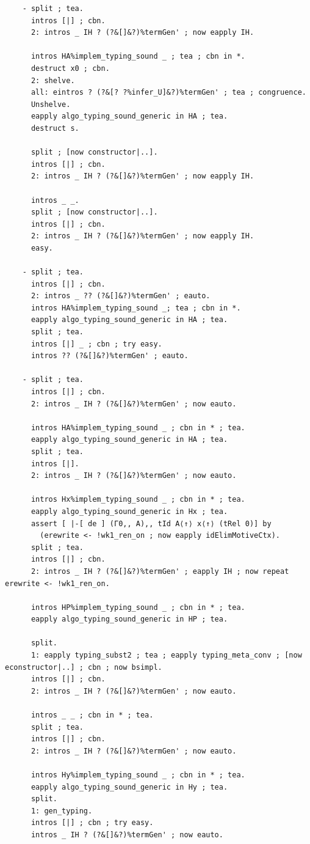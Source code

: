 \documentclass[10pt,a4paper]{amsart}
\begin{document}
\begin{lstlisting}
    - split ; tea.
      intros [|] ; cbn.
      2: intros _ IH ? (?&[]&?)%termGen' ; now eapply IH.
      
      intros HA%implem_typing_sound _ ; tea ; cbn in *.
      destruct x0 ; cbn.
      2: shelve.
      all: eintros ? (?&[? ?%infer_U]&?)%termGen' ; tea ; congruence.
      Unshelve.
      eapply algo_typing_sound_generic in HA ; tea.
      destruct s.

      split ; [now constructor|..].
      intros [|] ; cbn.
      2: intros _ IH ? (?&[]&?)%termGen' ; now eapply IH.

      intros _ _.
      split ; [now constructor|..].
      intros [|] ; cbn.
      2: intros _ IH ? (?&[]&?)%termGen' ; now eapply IH.
      easy.

    - split ; tea.
      intros [|] ; cbn.
      2: intros _ ?? (?&[]&?)%termGen' ; eauto.
      intros HA%implem_typing_sound _; tea ; cbn in *.
      eapply algo_typing_sound_generic in HA ; tea.
      split ; tea.
      intros [|] _ ; cbn ; try easy.
      intros ?? (?&[]&?)%termGen' ; eauto.

    - split ; tea.
      intros [|] ; cbn.
      2: intros _ IH ? (?&[]&?)%termGen' ; now eauto.

      intros HA%implem_typing_sound _ ; cbn in * ; tea.
      eapply algo_typing_sound_generic in HA ; tea.
      split ; tea.
      intros [|].
      2: intros _ IH ? (?&[]&?)%termGen' ; now eauto.

      intros Hx%implem_typing_sound _ ; cbn in * ; tea.
      eapply algo_typing_sound_generic in Hx ; tea.
      assert [ |-[ de ] (Γ0,, A),, tId A⟨↑⟩ x⟨↑⟩ (tRel 0)] by
        (erewrite <- !wk1_ren_on ; now eapply idElimMotiveCtx).
      split ; tea.
      intros [|] ; cbn.
      2: intros _ IH ? (?&[]&?)%termGen' ; eapply IH ; now repeat erewrite <- !wk1_ren_on.

      intros HP%implem_typing_sound _ ; cbn in * ; tea.
      eapply algo_typing_sound_generic in HP ; tea.

      split.
      1: eapply typing_subst2 ; tea ; eapply typing_meta_conv ; [now econstructor|..] ; cbn ; now bsimpl.
      intros [|] ; cbn.
      2: intros _ IH ? (?&[]&?)%termGen' ; now eauto.

      intros _ _ ; cbn in * ; tea.
      split ; tea.
      intros [|] ; cbn.
      2: intros _ IH ? (?&[]&?)%termGen' ; now eauto.

      intros Hy%implem_typing_sound _ ; cbn in * ; tea.
      eapply algo_typing_sound_generic in Hy ; tea.
      split.
      1: gen_typing.
      intros [|] ; cbn ; try easy.
      intros _ IH ? (?&[]&?)%termGen' ; now eauto.


\end{lstlisting}
\end{document}
